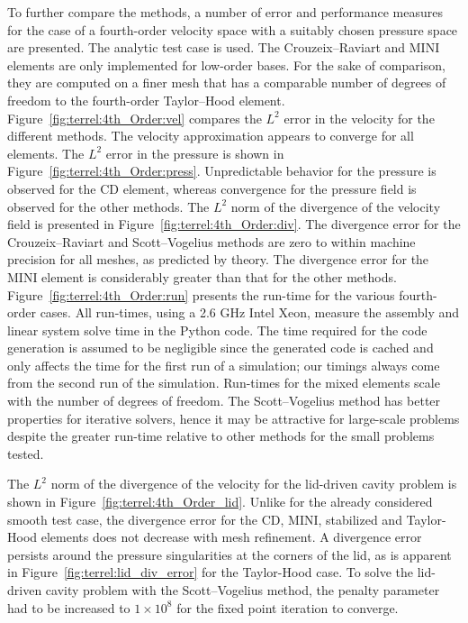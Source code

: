 To further compare the methods, a number of error and performance
measures for the case of a fourth-order velocity space with a suitably
chosen pressure space are presented. The analytic test case is used.
The Crouzeix--Raviart and MINI elements are only implemented for low-order
bases. For the sake of comparison, they are computed on a finer mesh
that has a comparable number of degrees of freedom to the fourth-order
Taylor--Hood element.
Figure~\ref{fig:terrel:4th_Order:vel} compares the $L^{2}$ error in the
velocity for the different methods. The velocity approximation appears
to converge for all elements.  The $L^{2}$ error in the pressure is
shown in Figure~\ref{fig:terrel:4th_Order:press}.  Unpredictable
behavior for the pressure is observed for the CD element, whereas
convergence for the pressure field is observed for the other methods.
The $L^{2}$ norm of the divergence of the velocity field is presented
in Figure~\ref{fig:terrel:4th_Order:div}.  The divergence error for the
Crouzeix--Raviart and Scott--Vogelius methods are zero to within machine
precision for all meshes, as predicted by theory. The divergence error for
the MINI element is considerably greater than that for the other methods. Figure~\ref{fig:terrel:4th_Order:run} presents the run-time for the
various fourth-order cases.  All run-times, using a 2.6 GHz Intel
Xeon, measure the assembly and linear system solve time in the Python
code. The time required for the code generation is assumed to be
negligible since the generated code is cached and only affects the
time for the first run of a simulation; our timings always come from
the second run of the simulation.  Run-times for the mixed elements
scale with the number of degrees of freedom. The Scott--Vogelius
method has better properties for iterative solvers, hence it may be
attractive for large-scale problems despite the greater run-time
relative to other methods for the small problems tested.

The $L^{2}$ norm of the divergence of the velocity for the lid-driven
cavity problem is shown in Figure~\ref{fig:terrel:4th_Order_lid}.
Unlike for the already considered smooth test case, the divergence
error for the CD, MINI, stabilized and Taylor-Hood elements does not
decrease with mesh refinement.  A divergence error persists around
the pressure singularities at the corners of the lid, as is apparent
in Figure~\ref{fig:terrel:lid_div_error} for the Taylor-Hood case.
To solve the lid-driven cavity problem with the Scott--Vogelius method,
the penalty parameter had to be increased to $1 \times 10^{8}$ for the
fixed point iteration to converge.

